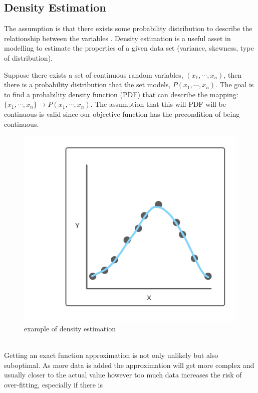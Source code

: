 \documentclass[10pt,a4paper]{report}
\begin{document}
				\subsection{Density Estimation}
					The assumption is that there exists some probability distribution to describe the relationship between the variables \autocite{sheather2004density}.
					Density estimation is a useful asset in modelling to estimate the properties of a given data set (variance, skewness, type of distribution). \par
					Suppose there exists a set of continuous random variables, $(x_1,\cdots,x_n)$, then there is a
					probability distribution that the set models, $P(x_1,\cdots,x_n)$. The goal is to find a probability density function (PDF)
					that can describe the mapping: $\{x_1,\cdots,x_n\} \to P(x_1,\cdots,x_n)$. The assumption that this will PDF will be continuous is valid
					since our objective function has the precondition of being continuous.
					\begin{figure}[h]
						\centering
						\includegraphics[scale=0.2]{density-estimation-diagram.jpg}
						\caption{example of density estimation}
						\label{fig:density-estimation}
					\end{figure} \\
					Getting an exact function approximation is not only unlikely but also suboptimal. As more data is added the approximation will
					get more complex and usually closer to the actual value however too much data increases the risk of over-fitting, especially if there is
\end{document}
